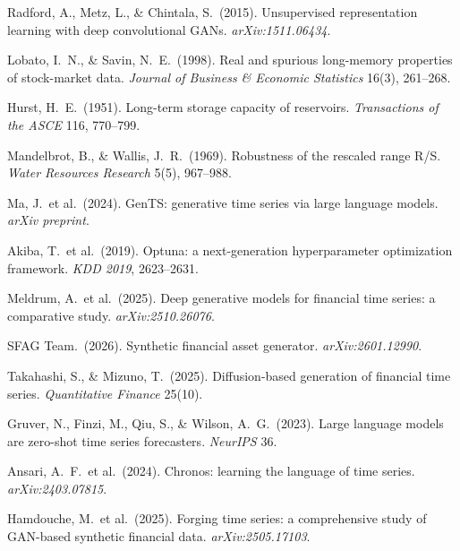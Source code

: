 \documentclass[11pt,a4paper]{article}
\makeatletter
\DeclareRobustCommand{\_}{\ifmmode\nfss@text{\textunderscore}\else\textunderscore\allowbreak\fi}
\makeatother
\begin{document}
{\begin{enumerate}[label={\textbf{[\arabic*]}},leftmargin=2.8em,itemsep=4pt,parsep=0pt,topsep=2pt]
\item \hypertarget{R:21}{}%
  Radford, A., Metz, L., \& Chintala, S.\ (2015). Unsupervised representation learning with deep convolutional GANs. \textit{arXiv:1511.06434}.

\item \hypertarget{R:22}{}%
  Lobato, I.\ N., \& Savin, N.\ E.\ (1998). Real and spurious long-memory properties of stock-market data. \textit{Journal of Business \& Economic Statistics} 16(3), 261--268.

\item \hypertarget{R:23}{}%
  Hurst, H.\ E.\ (1951). Long-term storage capacity of reservoirs. \textit{Transactions of the ASCE} 116, 770--799.

\item \hypertarget{R:24}{}%
  Mandelbrot, B., \& Wallis, J.\ R.\ (1969). Robustness of the rescaled range R/S. \textit{Water Resources Research} 5(5), 967--988.

\item \hypertarget{R:25}{}%
  Ma, J.\ et al.\ (2024). GenTS: generative time series via large language models. \textit{arXiv preprint}.

\item \hypertarget{R:26}{}%
  Akiba, T.\ et al.\ (2019). Optuna: a next-generation hyperparameter optimization framework. \textit{KDD 2019}, 2623--2631.

\item \hypertarget{R:27}{}%
  Meldrum, A.\ et al.\ (2025). Deep generative models for financial time series: a comparative study. \textit{arXiv:2510.26076}.

\item \hypertarget{R:28}{}%
  SFAG Team.\ (2026). Synthetic financial asset generator. \textit{arXiv:2601.12990}.

\item \hypertarget{R:29}{}%
  Takahashi, S., \& Mizuno, T.\ (2025). Diffusion-based generation of financial time series. \textit{Quantitative Finance} 25(10).

\item \hypertarget{R:30}{}%
  Gruver, N., Finzi, M., Qiu, S., \& Wilson, A.\ G.\ (2023). Large language models are zero-shot time series forecasters. \textit{NeurIPS} 36.

\item \hypertarget{R:31}{}%
  Ansari, A.\ F.\ et al.\ (2024). Chronos: learning the language of time series. \textit{arXiv:2403.07815}.

\item \hypertarget{R:32}{}%
  Hamdouche, M.\ et al.\ (2025). Forging time series: a comprehensive study of GAN-based synthetic financial data. \textit{arXiv:2505.17103}.


\end{enumerate}}
\end{document}
